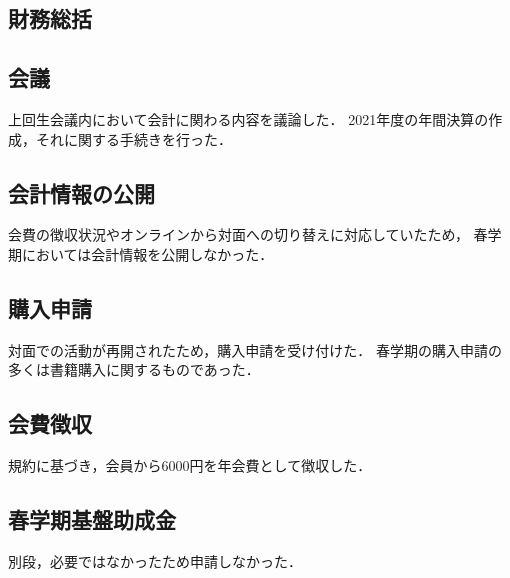 \subsection*{財務総括}


\subsection*{会議}
上回生会議内において会計に関わる内容を議論した．
2021年度の年間決算の作成，それに関する手続きを行った．

\subsection*{会計情報の公開}
会費の徴収状況やオンラインから対面への切り替えに対応していたため，
春学期においては会計情報を公開しなかった．

\subsection*{購入申請}
対面での活動が再開されたため，購入申請を受け付けた．
春学期の購入申請の多くは書籍購入に関するものであった．

\subsection*{会費徴収}
規約に基づき，会員から6000円を年会費として徴収した．

\subsection*{春学期基盤助成金}
別段，必要ではなかったため申請しなかった．
